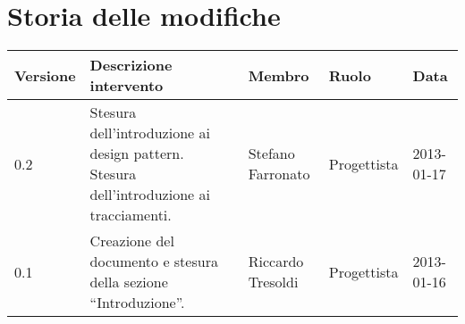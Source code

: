 \newcommand{\docName}{Specifica tecnica}
\newcommand{\docFileName}{specifica\_tecnica.1.0.pdf}
\newcommand{\docVers}{0.1}
\newcommand{\creationDate}{2013-01-16}
\newcommand{\modificationDate}{2013-01-17}
\newcommand{\docState}{Non approvato}
\newcommand{\docUsage}{Interno}
\newcommand{\docDistributionList}{Team SoftwareSynthesis}
\newcommand{\docAuthors}{}
\newcommand{\approvedBy}{}
\newcommand{\verifiedBy}{}
\newcommand{\docRoot}{..}
\def\INDICETABELLE{false}
\def\INDICEFIGURE{true}









\section*{Storia delle modifiche}
\begin{center}
\begin{longtable}{lp{}lll}
\toprule
Versione & Descrizione intervento & Membro & Ruolo & Data\\
\midrule %
0.2 & Stesura dell'introduzione ai design pattern. Stesura dell'introduzione ai tracciamenti. & Stefano Farronato & Progettista & 2013-01-17\\
0.1 & Creazione del documento e stesura della sezione ``Introduzione''. & Riccardo Tresoldi & Progettista & 2013-01-16\\
\bottomrule
\end{longtable}
\end{center}
\newpage

